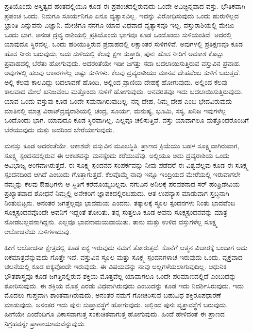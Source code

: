 ಪ್ರತಿಯೊಂದು ಅಸ್ತಿತ್ವದ ಹಂತದಲ್ಲಿಯೂ ಕೂಡ ಈ ಪ್ರಪಂಚದಲ್ಲಿರುವುದು ಒಂದೇ ಅವಿಚ್ಛಿನ್ನವಾದ ವಸ್ತು. ಭೌತಿಕವಾಗಿ ಪ್ರಪಂಚ ಒಂದು. ನಿಮಗೂ ಸೂರ್ಯನಿಗೂ ಏನೂ ವ್ಯತ್ಯಾಸವಿಲ್ಲ. ಇದನ್ನು ವಿರೋಧಿಸುವುದು ಒಂದು ಹುರುಳಿಲ್ಲದ ಭ್ರಾಂತಿ ಎನ್ನುವನು ವಿಜ್ಞಾನಿ. ಮೇಜಿಗೂ ನನಗೂ ಯಾವ ವಿಧವಾದ ವ್ಯತ್ಯಾಸವೂ ಇಲ್ಲ. ವಸ್ತುರಾಶಿಯಲ್ಲಿ ಮೇಜು ಒಂದು ಭಾಗ. ಅನಂತ ದ್ರವ್ಯ ರಾಶಿಯಲ್ಲಿ ಪ್ರತಿಯೊಂದು ಭಾಗವೂ ಕೂಡ ಒಂದೊಂದು ಸುಳಿಯಂತಿದೆ. ಅದರಲ್ಲಿ ಯಾವುದೂ ಸ್ಥಿರವಲ್ಲ. ಒಂದು ಹರಿಯುತ್ತಿರುವ ಪ್ರವಾಹದಲ್ಲಿ ಲಕ್ಷಾಂತರ ಸುಳಿಗಳಿವೆ. ಅವುಗಳಲ್ಲಿ ಪ್ರತಿಕ್ಷಣವೂ ಕೂಡ ಹೊಸ ನೀರು ಬರುವುದು, ಅದು ಸುಳಿಯಲ್ಲಿ ಕೆಲವು ಕ್ಷಣ ಸುತ್ತಾಡಿ, ಪುನಃ ಹೊಸ ನೀರಿಗೆ ಅವಕಾಶ ಕೊಟ್ಟು ಪ್ರವಾಹದಲ್ಲಿ ಬೆರೆತು ಹೋಗುವುದು. ಅದರಂತೆಯೇ ಇಡೀ ಜಗತ್ತು ಸದಾ ಬದಲಾಯಿಸುತ್ತಿರುವ ವಸ್ತುವಿನ ಪ್ರವಾಹ. ಅವುಗಳಲ್ಲಿ ಹಲವು ಆಕಾರಗಳೆಲ್ಲ ಅಷ್ಟು ಸುಳಿಗಳು. ಕೆಲವು ದ್ರವ್ಯರಾಶಿಯು ಮಾನವ ದೇಹವೆಂಬ ಸುಳಿಗೆ ಬರುತ್ತದೆ. ಅಲ್ಲಿ ಕೆಲವು ಕಾಲವಿದ್ದು ಬದಲಾವಣೆ ಹೊಂದಿ, ಅಲ್ಲಿಂದ ಪ್ರಾಣಿಯ ದೇಹಕ್ಕೆ ಹೋಗುವುದು. ಅಲ್ಲಿಂದ ಕೆಲವು ಕಾಲವಾದ ಮೇಲೆ ಖನಿಜವೆಂಬ ಮತ್ತೊಂದು ಸುಳಿಗೆ ಹೋಗುವುದು. ಅನವರತವೂ ಇದು ಬದಲಾಯಿಸುತ್ತಿರುವುದು. ಯಾವ ಒಂದು ವಸ್ತುವು ಕೂಡ ಒಂದೇ ಸಮನಾಗಿರುವುದಿಲ್ಲ. ನನ್ನ ದೇಹ, ನಿಮ್ಮ ದೇಹ ಎಂಬ ಭೇದವಿರುವುದು ಮಾತಿನಲ್ಲಿ ಮಾತ್ರ ವಿರಾಟ್​ ದ್ರವ್ಯರಾಶಿಯಲ್ಲಿ ಚಂದ್ರ, ಸೂರ್ಯ, ಮನುಷ್ಯ, ಭೂಮಿ, ಸಸ್ಯ, ಖನಿಜ ಇವುಗಳೆಲ್ಲ ಒಂದೊಂದು ಭಾಗ. ಯಾವುದೂ ಕೂಡ ಸ್ಥಿರವಾಗಿಲ್ಲ. ಎಲ್ಲವೂ ಚಲಿಸುತ್ತಿವೆ. ವಸ್ತು ಯಾವಾಗಲೂ ಮತ್ತೊಂದರೊಂದಿಗೆ ಬೆರೆಯುವುದು ಮತ್ತು ಅದರಿಂದ ಬೇರೆಯಾಗುವುದು. 

ಮನಸ್ಸು ಕೂಡ ಅದರಂತೆಯೇ. ಆಕಾಶವೇ ವಸ್ತುವಿನ ಮೂಲಸ್ಥಿತಿ. ಪ್ರಾಣದ ಕ್ರಿಯೆಯು ಬಹಳ ಸೂಕ್ಷ್ಮವಾಗಿರುವಾಗ, ಸೂಕ್ಷ್ಮ ಸ್ಪಂದನದಲ್ಲಿರುವ ಈ ಆಕಾಶವನ್ನು ಮನಸ್ಸೆಂದು ಕರೆಯುವೆವು. ಅಲ್ಲಿಯೂ ಅದು ದ್ರವ್ಯರಾಶಿಯ ಒಂದು ಅವಿಭಾಜ್ಯ ಅಂಗವಾಗಿರುತ್ತದೆ. ಈ ಸೂಕ್ಷ್ಮ ಸ್ಪಂದನದ ಸಂಪರ್ಕವನ್ನು ನೀವು ಪಡೆದರೆ ಈ ವಿಶ್ವವೆಲ್ಲವು ಕೂಡ ಈ ಸೂಕ್ಷ್ಮ ಸ್ಪಂದನದಿಂದ ಆಗಿದೆ ಎಂಬುದು ಗೊತ್ತಾಗುತ್ತದೆ. ಕೆಲವೊಮ್ಮೆ ನಾವು ಇನ್ನೂ ಇಂದ್ರಿಯದ ಮೇರೆಯಲ್ಲಿ ಇರುವಾಗಲೇ ನಮ್ಮನ್ನು ಕೆಲವು ಔಷಧಿಗಳು ಆ ಸ್ಥಿತಿಗೆ ಕರೆದೊಯ್ಯಬಲ್ಲವು. ನಗುವಿನ ಅನಿಲಕ್ಕೆ  ಪರವಶನಾದ ಸರ್​ ಹಂಫ್ರಿಡೇವಿಯ ಪ್ರಖ್ಯಾತವಾದ ಶೋಧನೆ ನಿಮ್ಮಲ್ಲಿ ಅನೇಕರಿಗೆ ಜ್ಞಾಪಕದಲ್ಲಿರಬಹುದು. ಆತ ಉಪನ್ಯಾಸ ಮಾಡುವಾಗ ಸ್ತಬ್ಧನಾಗಿ ನಿಂತುಬಿಟ್ಟನು. ಅನಂತರ ಜಗತ್ತೆಲ್ಲವೂ ಭಾವಮಯ ಎಂದನು. ತತ್ಕಾಲಕ್ಕೆ ಸ್ಥೂಲ ಸ್ಪಂದನಗಳು ನಿಂತು ಭಾವವೆಂಬ ಸೂಕ್ಷ್ಮಸ್ಪಂದನವೊಂದೇ ಅವನಿಗೆ ಇದ್ದಂತೆ ತೋರಿತು. ತನ್ನ ಸುತ್ತಲೂ ಕೂಡ ಅವನು ಸೂಕ್ಷ್ಮಸ್ಪಂದನವನ್ನು ಮಾತ್ರ ನೋಡಬಲ್ಲವನಾಗಿದ್ದನು. ಎಲ್ಲವೂ ಭಾವನಾಮಯವಾಯಿತು. ತಾನು ಮತ್ತು ಉಳಿದ ವಸ್ತುಗಳೆಲ್ಲ ಸೂಕ್ಷ್ಮ ಆಲೋಚನೆಯ ಸುಳಿಗಳಾದುವು. 

ಹೀಗೆ ಆಲೋಚನಾ ಕ್ಷೇತ್ರದಲ್ಲಿ ಕೂಡ ಐಕ್ಯ ಇರುವುದು ನಮಗೆ ತೋರುತ್ತದೆ. ಕೊನೆಗೆ ಆತ್ಮನ ವಿಚಾರಕ್ಕೆ ಬಂದಾಗ ಅದು ಐಕಮಾತ್ರವೆನ್ನುವುದು ಗೊತ್ತೇ ಇದೆ. ವಸ್ತುವಿನ ಸ್ಥೂಲ ಮತ್ತು ಸೂಕ್ಷ್ಮ ಸ್ಪಂದನಗಳಾಚೆ ಇರುವುದು ಒಂದು. ವ್ಯಕ್ತವಾದ ಚಲನೆಯಲ್ಲಿ ಕೂಡ ಐಕ್ಯವೊಂದೇ ಇರುವುದು. ಈ ವಿಷಯವನ್ನು ನಾವು ಅಲ್ಲಗಳೆಯಲಾಗುವುದಿಲ್ಲ. ಆಧುನಿಕ ಭೌತಶಾಸ್ತ್ರವೂ ಕೂಡ ಜಗತ್ತಿನಲ್ಲಿರುವ ಶಕ್ತಿಯ ಮೊತ್ತವೆಲ್ಲ ಯಾವಾಗಲೂ ಒಂದೇ ಪರಿಮಾಣದಲ್ಲಿದೆ ಎಂಬುದನ್ನು ತೋರಿಸುವುದು. ಈ ಶಕ್ತಿಯ ಮೊತ್ತ ಎರಡು ವಿಧವಾಗಿರುವುದು ಎಂಬುದನ್ನು ಕೂಡ ಇದು ನಿದರ್ಶಿಸಿರುವುದು. ಇದು ಮೊದಲು ಗುಪ್ತವಾಗಿ ಶಾಂತವಾಗಿರುವುದು; ಅನಂತರ ನಮಗೆ ಗೋಚರಿಸುವ ಬಹುವಿಧ ಶಕ್ತಿರೂಪಧಾರಣೆ ಮಾಡುವುದು. ಅನಂತರ ಇದು ಪುನಃ ಸುಪ್ತಾವಸ್ಥೆಗೆ ಹೋಗುವುದು. ಅಲ್ಲಿಂದ ಪುನಃ ವ್ಯಕ್ತಾವಸ್ಥೆಗೆ ಬರುವುದು. ಹೀಗೆಯೇ ಎಂದೆಂದಿಗೂ ವಿಕಾಸವಾಗುತ್ತ ಸಂಕುಚಿತವಾಗುತ್ತ ಹೋಗುವುದು. ಹಿಂದೆ ಹೇಳಿದಂತೆ ಈ ಪ್ರಾಣದ ನಿಗ್ರಹವನ್ನೇ ಪ್ರಾಣಾಯಾಮವೆನ್ನುವುದು. 

